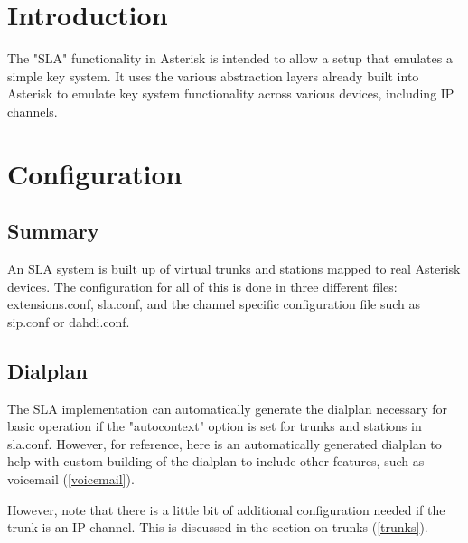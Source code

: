 

%


\section{Introduction}

The "SLA" functionality in Asterisk is intended to allow a setup that emulates
a simple key system.  It uses the various abstraction layers already built into
Asterisk to emulate key system functionality across various devices, including
IP channels.

\section{Configuration}

\subsection{Summary}

An SLA system is built up of virtual trunks and stations mapped to real
Asterisk devices.  The configuration for all of this is done in three
different files: extensions.conf, sla.conf, and the channel specific
configuration file such as sip.conf or dahdi.conf.

\subsection{Dialplan}

The SLA implementation can automatically generate the dialplan necessary for
basic operation if the "autocontext" option is set for trunks and stations in
sla.conf.  However, for reference, here is an automatically generated dialplan
to help with custom building of the dialplan to include other features, such as
voicemail (\ref{voicemail}).

However, note that there is a little bit of additional configuration needed if
the trunk is an IP channel.  This is discussed in the section on trunks (\ref{trunks}).

